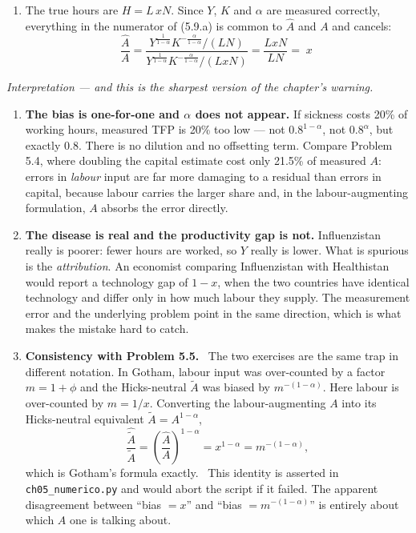 \documentclass[12pt, letterpaper]{article}
\begin{document}
\begin{tcolorbox}[oddbox,title={Problem 5.9 \quad Disease and TFP}]
\begin{enumerate}
\item The true hours are $H=L\,xN$. Since $Y$, $K$ and $\alpha$ are measured correctly,
everything in the numerator of (5.9.a) is common to $\hat A$ and $A$ and cancels:
\[
\frac{\hat A}{A}
=\frac{Y^{\frac{1}{1-\alpha}}K^{-\frac{\alpha}{1-\alpha}}/(LN)}
      {Y^{\frac{1}{1-\alpha}}K^{-\frac{\alpha}{1-\alpha}}/(LxN)}
=\frac{LxN}{LN}
=\boxed{\;x\;}
\]
\checkmark

\end{enumerate}

\smallskip
\emph{Interpretation --- and this is the sharpest version of the chapter's warning.}

\begin{enumerate}[label=\textbf{\arabic*.},leftmargin=1.6em,itemsep=4pt,topsep=3pt]
\item \textbf{The bias is one-for-one and $\alpha$ does not appear.} If sickness costs 20\%
of working hours, measured TFP is 20\% too low --- not $0.8^{1-\alpha}$, not
$0.8^{\alpha}$, but exactly $0.8$. There is no dilution and no offsetting term. Compare
Problem 5.4, where doubling the capital estimate cost only 21.5\% of measured $A$: errors in
\emph{labour} input are far more damaging to a residual than errors in capital, because
labour carries the larger share and, in the labour-augmenting formulation, $A$ absorbs the
error directly.

\item \textbf{The disease is real and the productivity gap is not.} Influenzistan really is
poorer: fewer hours are worked, so $Y$ really is lower. What is spurious is the
\emph{attribution}. An economist comparing Influenzistan with Healthistan would report a
technology gap of $1-x$, when the two countries have identical technology and differ only in
how much labour they supply. The measurement error and the underlying problem point in the
same direction, which is what makes the mistake hard to catch.

\item \textbf{Consistency with Problem 5.5.} \checkmark\ The two exercises are the same trap
in different notation. In Gotham, labour input was over-counted by a factor $m=1+\phi$ and
the Hicks-neutral $\tilde A$ was biased by $m^{-(1-\alpha)}$. Here labour is over-counted by
$m=1/x$. Converting the labour-augmenting $A$ into its Hicks-neutral equivalent
$\tilde A=A^{1-\alpha}$,
\[
\frac{\hat{\tilde A}}{\tilde A}=\left(\frac{\hat A}{A}\right)^{1-\alpha}=x^{1-\alpha}
=m^{-(1-\alpha)} ,
\]
which is Gotham's formula exactly. \checkmark\ This identity is asserted in
\texttt{ch05\_numerico.py} and would abort the script if it failed. The apparent
disagreement between ``bias $=x$'' and ``bias $=m^{-(1-\alpha)}$'' is entirely about which
$A$ one is talking about.


\end{enumerate}
\end{tcolorbox}
\end{document}
